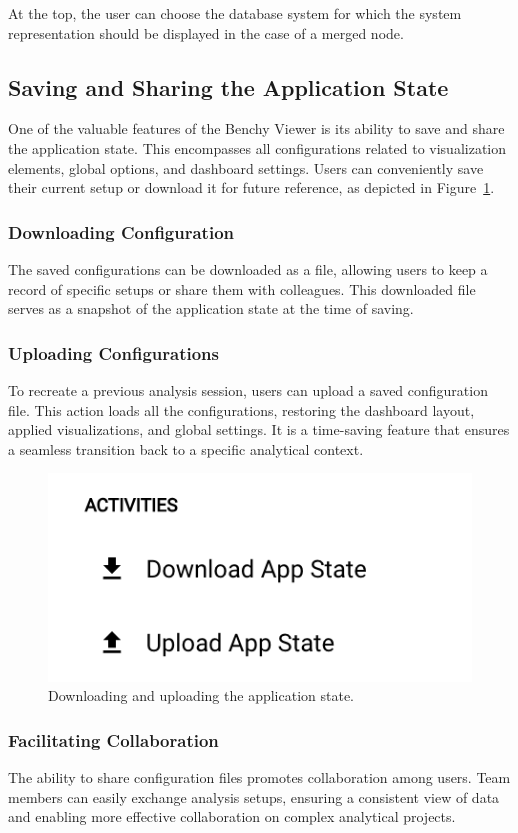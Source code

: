 At the top, the user can choose the database system for which the system representation should be displayed in the case of a merged node.


\subsection{Saving and Sharing the Application State}\label{sec:saving-sharing-state}

One of the valuable features of the Benchy Viewer is its ability to save and share the application state. This encompasses all configurations related to visualization elements, global options, and dashboard settings. Users can conveniently save their current setup or download it for future reference, as depicted in Figure~\ref{fig:save-upload}.

\subsubsection{Downloading Configuration}
The saved configurations can be downloaded as a file, allowing users to keep a record of specific setups or share them with colleagues. This downloaded file serves as a snapshot of the application state at the time of saving.

\subsubsection{Uploading Configurations}
To recreate a previous analysis session, users can upload a saved configuration file. This action loads all the configurations, restoring the dashboard layout, applied visualizations, and global settings. It is a time-saving feature that ensures a seamless transition back to a specific analytical context.


\begin{figure}[h]
  \vspace{0.5cm}
  \centering
  \includegraphics[width=0.4\linewidth]{figures/save-upload.png}
  \caption{Downloading and uploading the application state.}
  \label{fig:save-upload}
\end{figure}


\subsubsection{Facilitating Collaboration}
The ability to share configuration files promotes collaboration among users. Team members can easily exchange analysis setups, ensuring a consistent view of data and enabling more effective collaboration on complex analytical projects.

